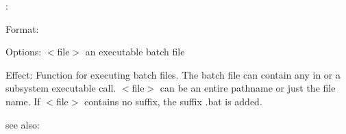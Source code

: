 \colab{} \exec:

Format: 

Options: $<$file$>$ an executable batch file

Effect: Function for executing batch files. 
        The batch file can contain any in \COLAB{} or a \COLAB{} subsystem 
        executable call.
        $<$file$>$ can be an entire pathname or just the file name.
	If $<$file$>$ contains no suffix, the suffix .bat is added.

see also: 
